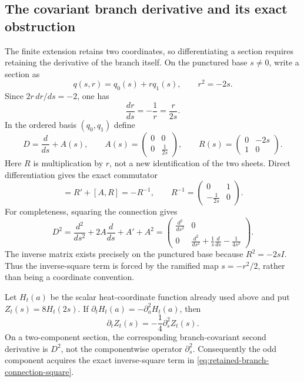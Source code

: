 \subsection{The covariant branch derivative and its exact obstruction}
\label{sec:retained-branch-connection}
The finite extension retains two coordinates, so differentiating a section
requires retaining the derivative of the branch itself. On the punctured
base $s\ne0$, write a section as
\[
 q(s,r)=q_0(s)+r q_1(s),\qquad r^2=-2s.
\]
Since $2r\,dr/ds=-2$, one has
\[
 \frac{dr}{ds}=-\frac1r=\frac{r}{2s}.
\]
In the ordered basis $(q_0,q_1)$ define
\begin{equation}
 D=\frac{d}{ds}+A(s),\qquad
 A(s)=\begin{pmatrix}0&0\\0&\frac1{2s}\end{pmatrix},
 \qquad
 R(s)=\begin{pmatrix}0&-2s\\1&0\end{pmatrix}.
 \label{eq:retained-branch-covariant-derivative}
\end{equation}
Here $R$ is multiplication by $r$, not a new identification of the two
sheets. Direct differentiation gives the exact commutator
\begin{equation}
 [D,R]=R'+[A,R]=-R^{-1},\qquad
 R^{-1}=\begin{pmatrix}0&1\\-\frac1{2s}&0\end{pmatrix}.
 \label{eq:retained-branch-connection-commutator}
\end{equation}
For completeness, squaring the connection gives
\begin{equation}
 D^2=\frac{d^2}{ds^2}+2A\frac{d}{ds}+A'+A^2
 =\begin{pmatrix}
 \frac{d^2}{ds^2}&0\\[2pt]
 0&\frac{d^2}{ds^2}+\frac1s\frac{d}{ds}-\frac1{4s^2}
 \end{pmatrix}.
 \label{eq:retained-branch-connection-square}
\end{equation}
The inverse matrix exists precisely on the punctured base because
$R^2=-2sI$. Thus the inverse-square term is forced by the ramified map
$s=-r^2/2$, rather than being a coordinate convention.

\begin{proposition}
Let $H_t(a)$ be the scalar heat-coordinate function already used above and
put $Z_t(s)=8H_t(2s)$. If $\partial_tH_t(a)=-\partial_a^2H_t(a)$, then
\begin{equation}
 \partial_tZ_t(s)=-\frac14\partial_s^2Z_t(s).
 \label{eq:retained-branch-heat-coordinate}
\end{equation}
On a two-component section, the corresponding branch-covariant second
derivative is $D^2$, not the componentwise operator $\partial_s^2$.
Consequently the odd component acquires the exact inverse-square term in
\eqref{eq:retained-branch-connection-square}.
\end{proposition}

